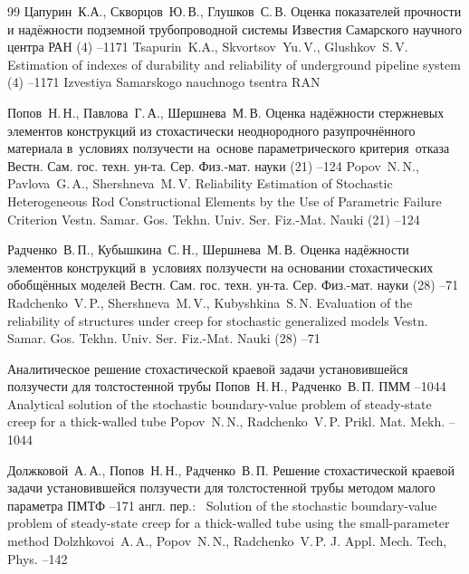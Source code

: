 \begin{thebibliography}{99}
\by  Цапурин~К.А., Скворцов~Ю.\,В., Глушков~С.\,В.
\paper Оценка показателей прочности и надёжности подземной трубопроводной системы
\jour Известия Самарского научного центра РАН
(4)
--1171
\misctransl 
\by Tsapurin~K.A., Skvortsov~Yu.\,V., Glushkov~S.\,V.
\paper Estimation of indexes of durability and reliability of underground pipeline system
(4)
--1171
\jour Izvestiya Samarskogo nauchnogo tsentra RAN

\by Попов~Н.\,Н., Павлова~Г.\,А., Шершнева~М.\,В.
\paper Оценка надёжности стержневых элементов конструкций из стохастически неоднородного разупрочнённого материала в~условиях ползучести на~основе параметрического критерия~отказа
\jour Вестн. Сам. гос. техн. ун-та. Сер. Физ.-мат. науки
(21)
--124
\misctransl
\by Popov~N.\,N., Pavlova~G.\,A., Shershneva~M.\,V.
\paper Reliability Estimation of Stochastic Heterogeneous Rod Constructional Elements by the Use of Parametric Failure Criterion
\jour Vestn. Samar. Gos. Tekhn. Univ. Ser. Fiz.-Mat. Nauki
(21)
--124


\by Радченко~В.\,П., Кубышкина~С.\,Н., Шершнева~М.\,В.
\paper Оценка надёжности элементов конструкций в~условиях ползучести на основании стохастических обобщённых моделей
\jour Вестн. Сам. гос. техн. ун-та. Сер. Физ.-мат. науки
(28)
--71
\misctransl
\by Radchenko~V.\,P., Shershneva~M.\,V., Kubyshkina~S.\,N.
\paper Evaluation of the reliability of structures under creep for stochastic generalized models
\jour Vestn. Samar. Gos. Tekhn. Univ. Ser. Fiz.-Mat. Nauki
(28)
--71

\paper Аналитическое решение стохастической краевой задачи установившейся ползучести для толстостенной трубы
\by  Попов~Н.\,Н., Радченко~В.\,П.
\jour ПММ
--1044
\misctransl
\paper Analytical solution of the stochastic boundary-value problem of steady-state creep for a thick-walled tube
\by  Popov~N.\,N., Radchenko~V.\,P.
\jour Prikl. Mat. Mekh.
--1044

\by Должковой~А.\,А., Попов~Н.\,Н., Радченко~В.\,П.
\paper Решение стохастической краевой задачи установившейся ползучести для толстостенной трубы методом малого параметра
\jour ПМТФ
--171
\transl англ. пер.:~
\paper Solution of the stochastic boundary-value problem of steady-state creep for a thick-walled tube using the small-parameter method
\by Dolzhkovoi~A.\,A., Popov~N.\,N., Radchenko~V.\,P.
\jour J. Appl. Mech. Tech, Phys.  
--142


\end{thebibliography}

